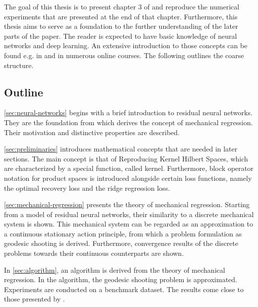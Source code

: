 The goal of this thesis is to present chapter 3 of \cite{owhadi20} and reproduce the numerical experiments that are presented at the end of that chapter.
Furthermore, this thesis aims to serve as a foundation to the further understanding of the later parts of the paper.
The reader is expected to have basic knowledge of neural networks and deep learning.
An extensive introduction to those concepts can be found e.g. in \cite{goodfellow16} and in numerous online courses.
The following outlines the coarse structure.

\subsection{Outline}

\cref{sec:neural-networks} begins with a brief introduction to residual neural networks.
They are the foundation from which \citet{owhadi20} derives the concept of mechanical regression.
Their motivation and distinctive properties are described.

\cref{sec:preliminaries} introduces mathematical concepts that are needed in later sections.
The main concept is that of Reproducing Kernel Hilbert Spaces, which are characterized by a special function, called kernel.
Furthermore, block operator notation for product spaces is introduced alongside certain loss functions, namely the optimal recovery loss and the ridge regression loss.

\cref{sec:mechanical-regression} presents the theory of mechanical regression.
Starting from a model of residual neural networks, their similarity to a discrete mechanical system is shown.
This mechanical system can be regarded as an approximation to a continuous stationary action principle, from which a problem formulation as geodesic shooting is derived.
Furthermore, convergence results of the discrete problems towards their continuous counterparts are shown.

In \cref{sec:algorithm}, an algorithm is derived from the theory of mechanical regression.
In the algorithm, the geodesic shooting problem is approximated.
Experiments are conducted on a benchmark dataset.
The results come close to those presented by \cite{owhadi20}.